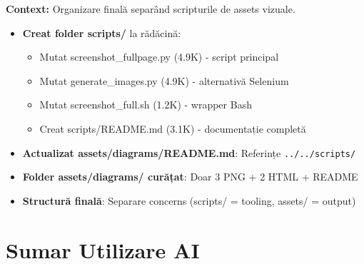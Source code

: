 \documentclass[11pt,a4paper]{article}
\begin{document}
\textbf{Context:} Organizare finală separând scripturile de assets vizuale.

\begin{tcolorbox}[colback=outputbackground,colframe=green!75!black,title=Output Generat]
\begin{itemize}[leftmargin=*]
    \item \textbf{Creat folder scripts/} la rădăcină:
    \begin{itemize}
        \item Mutat screenshot\_fullpage.py (4.9K) - script principal
        \item Mutat generate\_images.py (4.9K) - alternativă Selenium
        \item Mutat screenshot\_full.sh (1.2K) - wrapper Bash
        \item Creat scripts/README.md (3.1K) - documentație completă
    \end{itemize}
    \item \textbf{Actualizat assets/diagrams/README.md}: Referințe \texttt{../../scripts/}
    \item \textbf{Folder assets/diagrams/ curățat}: Doar 3 PNG + 2 HTML + README
    \item \textbf{Structură finală}: Separare concerns (scripts/ = tooling, assets/ = output)
\end{itemize}
\end{tcolorbox}

\newpage
\section{Sumar Utilizare AI}
\end{document}
